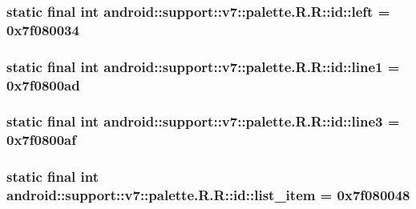 \hypertarget{classandroid_1_1support_1_1v7_1_1palette_1_1_r_1_1id_affce55a096b05786c0ba8bccde4cc2b}{
\subsubsection[{left}]{\setlength{\rightskip}{0pt plus 5cm}static final int android::support::v7::palette.R.R::id::left = 0x7f080034}}
\label{classandroid_1_1support_1_1v7_1_1palette_1_1_r_1_1id_affce55a096b05786c0ba8bccde4cc2b}


\hypertarget{classandroid_1_1support_1_1v7_1_1palette_1_1_r_1_1id_5a23459582414196f252ba6e16016c5d}{
\subsubsection[{line1}]{\setlength{\rightskip}{0pt plus 5cm}static final int android::support::v7::palette.R.R::id::line1 = 0x7f0800ad}}
\label{classandroid_1_1support_1_1v7_1_1palette_1_1_r_1_1id_5a23459582414196f252ba6e16016c5d}


\hypertarget{classandroid_1_1support_1_1v7_1_1palette_1_1_r_1_1id_3bc3dd764143ffb54cedf30db5354127}{
\subsubsection[{line3}]{\setlength{\rightskip}{0pt plus 5cm}static final int android::support::v7::palette.R.R::id::line3 = 0x7f0800af}}
\label{classandroid_1_1support_1_1v7_1_1palette_1_1_r_1_1id_3bc3dd764143ffb54cedf30db5354127}


\hypertarget{classandroid_1_1support_1_1v7_1_1palette_1_1_r_1_1id_e8c619212812b2ba95c67e67eaebecc6}{
\subsubsection[{list\_\-item}]{\setlength{\rightskip}{0pt plus 5cm}static final int android::support::v7::palette.R.R::id::list\_\-item = 0x7f080048}}
\label{classandroid_1_1support_1_1v7_1_1palette_1_1_r_1_1id_e8c619212812b2ba95c67e67eaebecc6}


